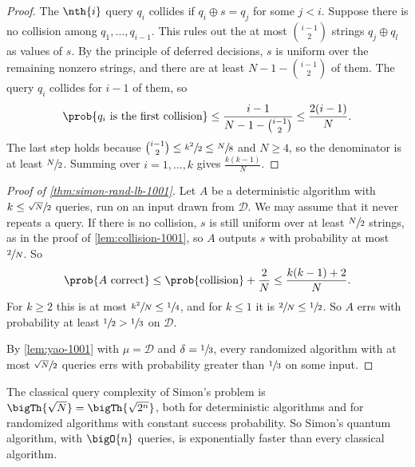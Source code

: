 \begin{proof}
    The $\nth{i}$ query $q_i$ collides if $q_i \oplus s = q_j$ for some $j < i$. Suppose there is no
    collision among $q_1, \dots, q_{i-1}$. This rules out the at most $\binom{i-1}{2}$ strings
    $q_j \oplus q_l$ as values of $s$. By the principle of deferred decisions, $s$ is uniform over
    the remaining nonzero strings, and there are at least $N - 1 - \binom{i-1}{2}$ of them. The
    query $q_i$ collides for $i - 1$ of them, so
    \[\prob{q_i \text{ is the first collision}} \leq \frac{i-1}{N - 1 - \binom{i-1}{2}} \leq \frac{2(i-1)}{N}.\]
    The last step holds because $\binom{i-1}{2} \leq \sfrac{k^2}{2} \leq \sfrac{N}{8}$ and $N \geq 4$,
    so the denominator is at least $\sfrac{N}{2}$. Summing over $i = 1, \dots, k$ gives
    $\frac{k(k-1)}{N}$.
\end{proof}

\begin{proof}[Proof of \cref{thm:simon-rand-lb-1001}]
    Let $A$ be a deterministic algorithm with $k \leq \sfrac{\sqrt{N}}{2}$ queries, run on an input
    drawn from $\mathcal{D}$. We may assume that it never repeats a query. If there is no collision,
    $s$ is still uniform over at least $\sfrac{N}{2}$ strings, as in the proof of
    \cref{lem:collision-1001}, so $A$ outputs $s$ with probability at most $\sfrac{2}{N}$. So
    \[\prob{A \text{ correct}} \leq \prob{\text{collision}} + \frac{2}{N} \leq \frac{k(k-1) + 2}{N}.\]
    For $k \geq 2$ this is at most $\sfrac{k^2}{N} \leq \sfrac{1}{4}$, and for $k \leq 1$ it is
    $\sfrac{2}{N} \leq \sfrac{1}{2}$. So $A$ errs with probability at least
    $\sfrac{1}{2} > \sfrac{1}{3}$ on $\mathcal{D}$.

    By \cref{lem:yao-1001} with $\mu = \mathcal{D}$ and $\delta = \sfrac{1}{3}$, every randomized
    algorithm with at most $\sfrac{\sqrt{N}}{2}$ queries errs with probability greater than
    $\sfrac{1}{3}$ on some input.
\end{proof}

\begin{corollary}\label{thm:simon-det-lb-1001}
    The classical query complexity of Simon's problem is $\bigTh{\sqrt{N}} = \bigTh{\sqrt{2^n}}$, both
    for deterministic algorithms and for randomized algorithms with constant success probability.
    So Simon's quantum algorithm, with $\bigO{n}$ queries, is exponentially faster than every
    classical algorithm.
\end{corollary}

